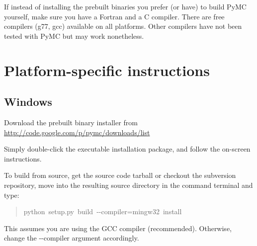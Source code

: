 If instead of installing the prebuilt binaries you prefer (or have) to build PyMC
yourself, make sure you have a Fortran and a C compiler. There are free
compilers (g77, gcc) available on all platforms. Other compilers have not been
tested with PyMC but may work nonetheless.



\hypertarget{platform-specific-instructions}{}
\section*{Platform-specific instructions}
\label{platform-specific-instructions}



\hypertarget{windows}{}
\subsection*{Windows}
\label{windows}
\begin{list}{.}
{
\setlength{\rightmargin}{\leftmargin}
}
\item {} 
Download the prebuilt binary installer from \href{http://code.google.com/p/pymc/downloads/list}{http://code.google.com/p/pymc/downloads/list}

\item {} 
Simply double-click the executable installation package, and follow the on-screen instructions.

\end{list}

To build from source, get the source code tarball or checkout the subversion
repository, move into the resulting source directory in the command terminal
and type:
\begin{quote}{\ttfamily \raggedright \noindent
python~setup.py~build~-{}-compiler=mingw32~install
}\end{quote}

This assumes you are using the GCC compiler (recommended). Otherwise,
change the -{}-compiler argument accordingly.



\hypertarget{mac-os-x}{}
